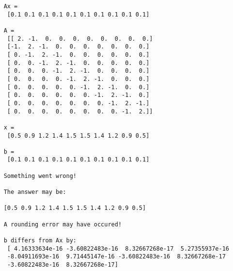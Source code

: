 \documentclass{article}
\begin{document}
\begin{lstlisting}
    Ax =
     [0.1 0.1 0.1 0.1 0.1 0.1 0.1 0.1 0.1 0.1] 

    A =
     [[ 2. -1.  0.  0.  0.  0.  0.  0.  0.  0.]
     [-1.  2. -1.  0.  0.  0.  0.  0.  0.  0.]
     [ 0. -1.  2. -1.  0.  0.  0.  0.  0.  0.]
     [ 0.  0. -1.  2. -1.  0.  0.  0.  0.  0.]
     [ 0.  0.  0. -1.  2. -1.  0.  0.  0.  0.]
     [ 0.  0.  0.  0. -1.  2. -1.  0.  0.  0.]
     [ 0.  0.  0.  0.  0. -1.  2. -1.  0.  0.]
     [ 0.  0.  0.  0.  0.  0. -1.  2. -1.  0.]
     [ 0.  0.  0.  0.  0.  0.  0. -1.  2. -1.]
     [ 0.  0.  0.  0.  0.  0.  0.  0. -1.  2.]] 

    x =
     [0.5 0.9 1.2 1.4 1.5 1.5 1.4 1.2 0.9 0.5] 

    b =
     [0.1 0.1 0.1 0.1 0.1 0.1 0.1 0.1 0.1 0.1]

    Something went wrong!

    The answer may be:

    [0.5 0.9 1.2 1.4 1.5 1.5 1.4 1.2 0.9 0.5] 

    A rounding error may have occured!

    b differs from Ax by:
     [ 4.16333634e-16 -3.60822483e-16  8.32667268e-17  5.27355937e-16
     -8.04911693e-16  9.71445147e-16 -3.60822483e-16  8.32667268e-17
     -3.60822483e-16  8.32667268e-17]
    
\end{lstlisting}
\end{document}
